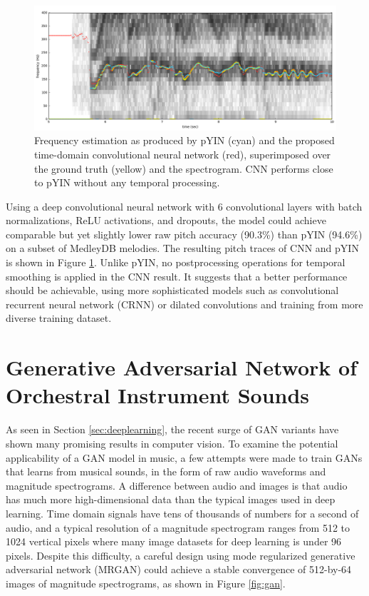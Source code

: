 \begin{figure}
	\includegraphics[width=\textwidth]{crepe.png}
	\caption{Frequency estimation as produced by pYIN (cyan) and the proposed time-domain convolutional neural network (red), superimposed over the ground truth (yellow) and the spectrogram. CNN performs close to pYIN without any temporal processing.}\label{fig:crepe}
\end{figure}

Using a deep convolutional neural network with 6 convolutional layers with batch normalizations, ReLU activations, and dropouts, the model could achieve comparable but yet slightly lower raw pitch accuracy (90.3\%) than pYIN (94.6\%) on a subset of MedleyDB \cite{bittner2014medleydb} melodies.
The resulting pitch traces of CNN and pYIN is shown in Figure \ref{fig:crepe}.
Unlike pYIN, no postprocessing operations for temporal smoothing is applied in the CNN result.
It suggests that a better performance should be achievable, using more sophisticated models such as convolutional recurrent neural network (CRNN) or dilated convolutions and training from more diverse training dataset.


\section{Generative Adversarial Network of Orchestral Instrument Sounds}


As seen in Section \ref{sec:deeplearning}, the recent surge of GAN variants have shown many promising results in computer vision.
To examine the potential applicability of a GAN model in music, a few attempts were made to train GANs that learns from musical sounds, in the form of raw audio waveforms and magnitude spectrograms.
A difference between audio and images is that audio has much more high-dimensional data than the typical images used in deep learning.
Time domain signals have tens of thousands of numbers for a second of audio, and a typical resolution of a magnitude spectrogram ranges from 512 to 1024 vertical pixels where many image datasets for deep learning is under 96 pixels.
Despite this difficulty, a careful design using mode regularized generative adversarial network (MRGAN) \cite{che2016mrgan} could achieve a stable convergence of 512-by-64 images of magnitude spectrograms, as shown in Figure \ref{fig:gan}.


